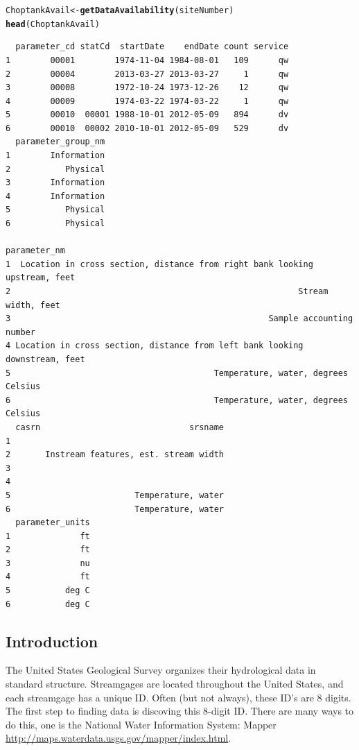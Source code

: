 \documentclass[a4paper,11pt]{article}\usepackage[]{graphicx}\usepackage[]{color}
\makeatletter
\newcommand{\hlstd}[1]{\textcolor[rgb]{0.345,0.345,0.345}{#1}}%
\newcommand{\hlkwb}[1]{\textcolor[rgb]{0.69,0.353,0.396}{#1}}%
\newcommand{\hlkwd}[1]{\textcolor[rgb]{0.737,0.353,0.396}{\textbf{#1}}}%
\newenvironment{kframe}{%
 \def\at@end@of@kframe{}%
 \ifinner\ifhmode%
  \def\at@end@of@kframe{\end{minipage}}%
  \begin{minipage}{\columnwidth}%
 \fi\fi%
 \def\FrameCommand##1{\hskip\@totalleftmargin \hskip-\fboxsep
 \colorbox{shadecolor}{##1}\hskip-\fboxsep
     \hskip-\linewidth \hskip-\@totalleftmargin \hskip\columnwidth}%
 \MakeFramed {\advance\hsize-\width
   \@totalleftmargin\z@ \linewidth\hsize
   \@setminipage}}%
 {\par\unskip\endMakeFramed%
 \at@end@of@kframe}
\newenvironment{knitrout}{}{} %
\makeatother
\begin{document}
\begin{knitrout}
\color{fgcolor}\begin{kframe}
\begin{alltt}
\hlstd{ChoptankAvail} \hlkwb{<-} \hlkwd{getDataAvailability}\hlstd{(siteNumber)}
\hlkwd{head}\hlstd{(ChoptankAvail)}
\end{alltt}
\begin{verbatim}
  parameter_cd statCd  startDate    endDate count service
1        00001        1974-11-04 1984-08-01   109      qw
2        00004        2013-03-27 2013-03-27     1      qw
3        00008        1972-10-24 1973-12-26    12      qw
4        00009        1974-03-22 1974-03-22     1      qw
5        00010  00001 1988-10-01 2012-05-09   894      dv
6        00010  00002 2010-10-01 2012-05-09   529      dv
  parameter_group_nm
1        Information
2           Physical
3        Information
4        Information
5           Physical
6           Physical
                                                                 parameter_nm
1  Location in cross section, distance from right bank looking upstream, feet
2                                                          Stream width, feet
3                                                    Sample accounting number
4 Location in cross section, distance from left bank looking downstream, feet
5                                         Temperature, water, degrees Celsius
6                                         Temperature, water, degrees Celsius
  casrn                              srsname
1                                           
2       Instream features, est. stream width
3                                           
4                                           
5                         Temperature, water
6                         Temperature, water
  parameter_units
1              ft
2              ft
3              nu
4              ft
5           deg C
6           deg C
\end{verbatim}
\end{kframe}
\end{knitrout}


\subsection{Introduction}
The United States Geological Survey organizes their hydrological data in standard structure.  Streamgages are located throughout the United States, and each streamgage has a unique ID.  Often (but not always), these ID's are 8 digits.  The first step to finding data is discoving this 8-digit ID. There are many ways to do this, one is the National Water Information System: Mapper \url{http://maps.waterdata.usgs.gov/mapper/index.html}.
\end{document}
